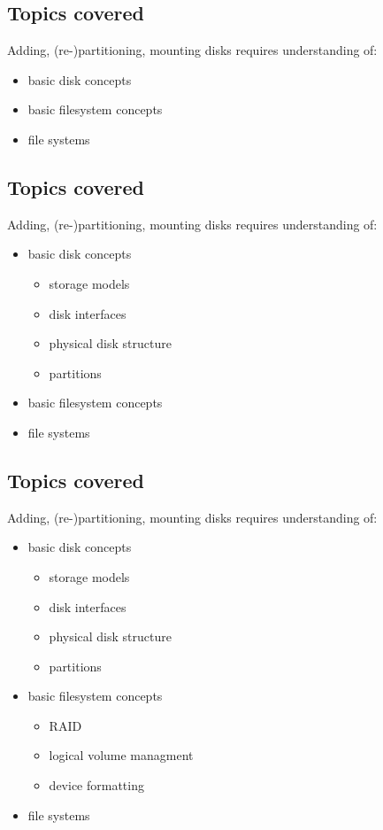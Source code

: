 \documentclass[xga]{xdvislides}
\begin{document}
\subsection{Topics covered}
Adding, (re-)partitioning, mounting disks requires understanding of:
\begin{itemize}
	\item basic disk concepts
	\item basic filesystem concepts
	\item file systems
\end{itemize}

\subsection{Topics covered}
Adding, (re-)partitioning, mounting disks requires understanding of:
\begin{itemize}
	\item basic disk concepts
		\begin{itemize}
			\item storage models
			\item disk interfaces
			\item physical disk structure
			\item partitions
		\end{itemize}
	\item basic filesystem concepts
	\item file systems
\end{itemize}

\subsection{Topics covered}
Adding, (re-)partitioning, mounting disks requires understanding of:
\begin{itemize}
	\item basic disk concepts
		\begin{itemize}
			\item storage models
			\item disk interfaces
			\item physical disk structure
			\item partitions
		\end{itemize}
	\item basic filesystem concepts
		\begin{itemize}
			\item RAID
			\item logical volume managment
			\item device formatting
		\end{itemize}
	\item file systems
\end{itemize}
\end{document}
